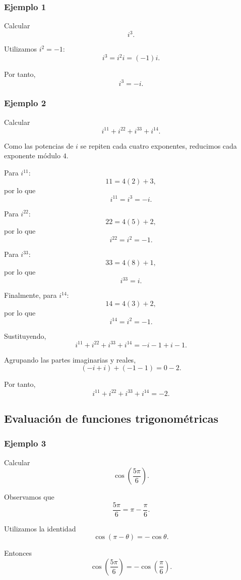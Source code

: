 \subsubsection*{Ejemplo 1}

Calcular
\[
i^3.
\]

Utilizamos $i^2=-1$:
\[
i^3=i^2i=(-1)i.
\]

Por tanto,
\[
\boxed{i^3=-i}.
\]

\subsubsection*{Ejemplo 2}

Calcular
\[
i^{11}+i^{22}+i^{33}+i^{14}.
\]

Como las potencias de $i$ se repiten cada cuatro exponentes,
reducimos cada exponente módulo $4$.

Para $i^{11}$:
\[
11=4(2)+3,
\]
por lo que
\[
i^{11}=i^3=-i.
\]

Para $i^{22}$:
\[
22=4(5)+2,
\]
por lo que
\[
i^{22}=i^2=-1.
\]

Para $i^{33}$:
\[
33=4(8)+1,
\]
por lo que
\[
i^{33}=i.
\]

Finalmente, para $i^{14}$:
\[
14=4(3)+2,
\]
por lo que
\[
i^{14}=i^2=-1.
\]

Sustituyendo,
\[
i^{11}+i^{22}+i^{33}+i^{14}
=
-i-1+i-1.
\]

Agrupando las partes imaginarias y reales,
\[
(-i+i)+(-1-1)=0-2.
\]

Por tanto,
\[
\boxed{i^{11}+i^{22}+i^{33}+i^{14}=-2}.
\]

\subsection{Evaluación de funciones trigonométricas}

\subsubsection*{Ejemplo 3}

Calcular
\[
\cos\left(\frac{5\pi}{6}\right).
\]

Observamos que
\[
\frac{5\pi}{6}
=
\pi-\frac{\pi}{6}.
\]

Utilizamos la identidad
\[
\cos(\pi-\theta)=-\cos\theta.
\]

Entonces
\[
\cos\left(\frac{5\pi}{6}\right)
=
-\cos\left(\frac{\pi}{6}\right).
\]

